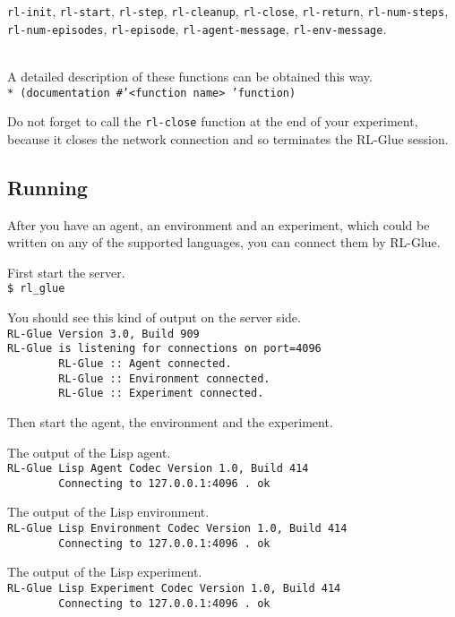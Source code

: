 \documentclass[11pt,a4paper,dvipdfm]{article}
\newcommand{\prompttext}[1]{\texttt{#1}}
\newcommand{\shprompt}[1]{\prompttext{\$ #1}}
\newcommand{\lispprompt}[1]{\prompttext{* #1}}
\begin{document}
\prompttext{rl-init},
\prompttext{rl-start},
\prompttext{rl-step},
\prompttext{rl-cleanup},
\prompttext{rl-close},
\prompttext{rl-return},
\prompttext{rl-num-steps}, \\
\prompttext{rl-num-episodes},
\prompttext{rl-episode},
\prompttext{rl-agent-message},
\prompttext{rl-env-message}.

\ \\
A detailed description of these functions can be obtained this way. \\
\lispprompt{(documentation \#'<function name> 'function)}

Do not forget to call the \prompttext{rl-close} function at the end of your
experiment, because it closes the network connection and so terminates the
RL-Glue session.

\subsection{Running}

After you have an agent, an environment and an experiment, which could be
written on any of the supported languages, you can connect them by RL-Glue.

First start the server. \\
\shprompt{rl\_glue}

You should see this kind of output on the server side. \\
\prompttext{RL-Glue Version 3.0, Build 909 \\
RL-Glue is listening for connections on port=4096 \\
\mbox{~~~~~~~~}RL-Glue ::~Agent connected. \\
\mbox{~~~~~~~~}RL-Glue ::~Environment connected. \\
\mbox{~~~~~~~~}RL-Glue ::~Experiment connected.}

Then start the agent, the environment and the experiment.

The output of the Lisp agent. \\
\prompttext{RL-Glue Lisp Agent Codec Version 1.0, Build 414 \\
\mbox{~~~~~~~~}Connecting to 127.0.0.1:4096 .~ok}

The output of the Lisp environment. \\
\prompttext{RL-Glue Lisp Environment Codec Version 1.0, Build 414 \\
\mbox{~~~~~~~~}Connecting to 127.0.0.1:4096 .~ok}

The output of the Lisp experiment. \\
\prompttext{RL-Glue Lisp Experiment Codec Version 1.0, Build 414 \\
\mbox{~~~~~~~~}Connecting to 127.0.0.1:4096 .~ok}
\end{document}
